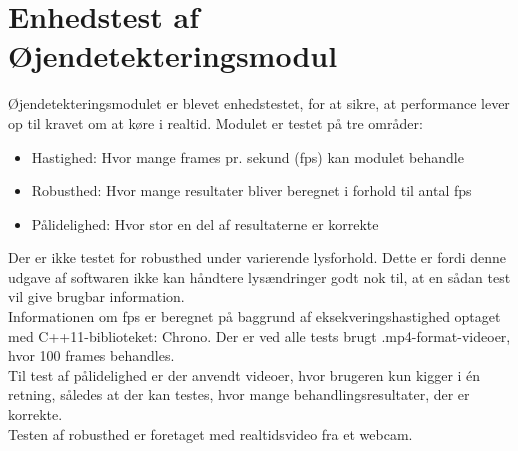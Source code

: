%
%

\chapter{Enhedstest af Øjendetekteringsmodul}
\label{appendix:Bilag_enhedstest_eyetracking}

Øjendetekteringsmodulet er blevet enhedstestet, for at sikre, at performance lever op til kravet om at køre i realtid. 
Modulet er testet på tre områder:

\begin{itemize}
	\item Hastighed: Hvor mange frames pr. sekund (fps) kan modulet behandle
	\item Robusthed: Hvor mange resultater bliver beregnet i forhold til antal fps
	\item Pålidelighed: Hvor stor en del af resultaterne er korrekte
\end{itemize}

Der er ikke testet for robusthed under varierende lysforhold.
Dette er fordi denne udgave af softwaren ikke kan håndtere lysændringer godt nok til, at en sådan test vil give brugbar information. \\
Informationen om fps er beregnet på baggrund af eksekveringshastighed optaget med C++11-biblioteket: Chrono. 
Der er ved alle tests brugt .mp4-format-videoer, hvor 100 frames behandles. \\
Til test af pålidelighed er der anvendt videoer, hvor brugeren kun kigger i én retning, således at der kan testes, hvor mange behandlingsresultater, der er korrekte.\\
Testen af robusthed er foretaget med realtidsvideo fra et webcam.


